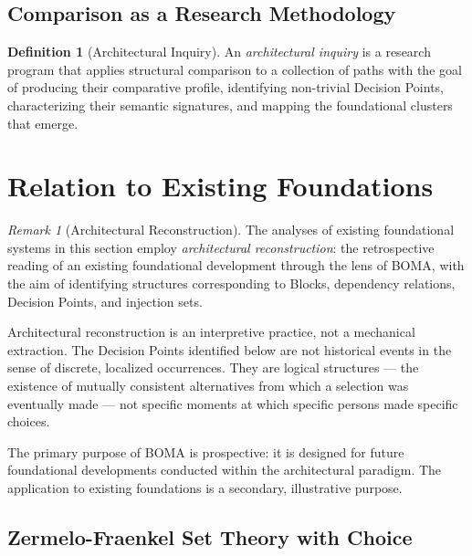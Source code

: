 \documentclass[12pt, a4paper]{article}
\theoremstyle{plain}
\theoremstyle{definition}
\newtheorem{definition}[theorem]{Definition}
\theoremstyle{remark}
\newtheorem{remark}[theorem]{Remark}
\newcommand{\BOMA}{\textsf{BOMA}}
\begin{document}
\subsection{Comparison as a Research Methodology}
\label{subsec:methodology}

\begin{definition}[Architectural Inquiry]
\label{def:architectural-inquiry}
An \emph{architectural inquiry} is a research program that applies
structural comparison to a collection of paths with the goal of
producing their comparative profile, identifying non-trivial Decision
Points, characterizing their semantic signatures, and mapping the
foundational clusters that emerge.
\end{definition}

\section{Relation to Existing Foundations}
\label{sec:existing}

\begin{remark}[Architectural Reconstruction]
\label{rem:reconstruction}
The analyses of existing foundational systems in this section employ
\emph{architectural reconstruction}: the retrospective reading of an
existing foundational development through the lens of \BOMA{}, with
the aim of identifying structures corresponding to Blocks, dependency
relations, Decision Points, and injection sets.

Architectural reconstruction is an interpretive practice, not a
mechanical extraction. The Decision Points identified below are not
historical events in the sense of discrete, localized occurrences.
They are logical structures --- the existence of mutually consistent
alternatives from which a selection was eventually made --- not
specific moments at which specific persons made specific choices.

The primary purpose of \BOMA{} is prospective: it is designed for
future foundational developments conducted within the architectural
paradigm. The application to existing foundations is a secondary,
illustrative purpose.
\end{remark}

\subsection{Zermelo-Fraenkel Set Theory with Choice}
\label{subsec:zfc}
\end{document}
